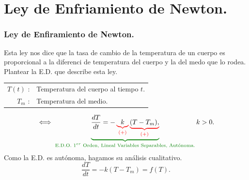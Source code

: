 \documentclass{beamer}
\begin{document}
\frame{\titlepage}

\section{Ley de Enfriamiento de Newton.} %
\begin{frame}[t]
	\frametitle{Ley de Enfiramiento de Newton.}
	\vspace{-5mm}
	\begin{block}{}
	Esta ley nos dice que la tasa de cambio de la temperatura de un cuerpo es proporcional a la diferenci de temperatura del cuerpo y la del medo que lo rodea. Plantear la E.D. que describe esta ley.
	\begin{table}[ht]
		\centering
		\color{blue!80}
		\begin{tabular}{rl}
			\(T(t)\) : & Temperatura del cuerpo al tiempo \(t\). \\[2mm]
			\(T_m\) : & Temperatura del medio.
		\end{tabular}
	\end{table}
	\[
		\iff \color{green!50!black} \underbrace{\color{black} \dfrac{dT}{dt} = - \color{red} \underbrace{\color{black} k} _{(+)} \underbrace{\color{black} (T-T_m),} _{(+)}} _\text{\color{green!50!black} E.D.O. \(1^{er}\) Orden, Lineal Variables Separables, Autónoma.}  \color{black} k>0.
	\]
	Como la E.D. es autónoma, hagamos su análisis cualitativo.
		\[
			\dfrac{dT}{dt} = -k(T-T_m) = f(T).
		\]
	\end{block}

\end{frame}
\end{document}
